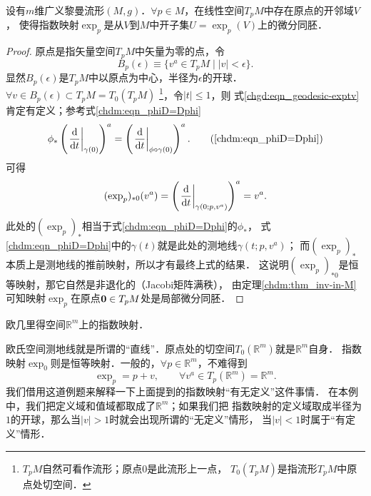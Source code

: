 \begin{theorem}\label{chgd:thm_exp-homeomorphism}
    设有$m$维广义黎曼流形$(M,g)$．$\forall p \in M$，在线性空间$T_p M$中存在原点的开邻域$V$，
    使得指数映射$\exp_{p}$是从$V$到$M$中开子集$U=\exp_{p}(V)$上的微分同胚．
\end{theorem}
\begin{proof}
    原点是指矢量空间$T_p M$中矢量为零的点，令
    \begin{equation}
        B_p(\epsilon) \equiv \{v^a\in T_pM \mid |v|<\epsilon \} .
    \end{equation}
    显然$B_p(\epsilon)$是$T_pM$中以原点为中心，半径为$\epsilon$的开球．
    $\forall v\in B_p(\epsilon) \subset T_pM= T_0(T_pM) $
    {\footnote{$T_pM$自然可看作流形；原点$0$是此流形上一点，
            $T_0(T_p M)$是指流形$T_pM$中原点处切空间．}}，令$|t|\leqslant 1$，则
    式\eqref{chgd:eqn_geodesic-exptv}肯定有定义；参考式\eqref{chdm:eqn_phiD=Dphi}
    \begin{equation}
        \phi_{*}\left(\left.\frac{{\rm d}  }{{\rm d} t}\right|_{\gamma(0)}\right)^a
        = \left(\left.\frac{{\rm d}  }{{\rm d} t}\right|_{\phi\circ\gamma(0)}\right)^a.
        \tag{\ref{chdm:eqn_phiD=Dphi}}
    \end{equation}
    可得
    \begin{equation}
        (\exp_{p})_{*0} (v^a) = \left(\left.\frac{{\rm d}  }{{\rm d} t}
         \right|_{\gamma(0;p,v^a)}\right)^a = v^a .
    \end{equation}
    此处的$(\exp_{p})_{*}$相当于式\eqref{chdm:eqn_phiD=Dphi}的$\phi_{*}$，
    式\eqref{chdm:eqn_phiD=Dphi}中的$\gamma(t)$就是此处的测地线$\gamma(t;p,v^a)$；
    而$(\exp_{p})_{*}$本质上是测地线的推前映射，所以才有最终上式的结果．
    这说明$(\exp_{p})_{*0}$是恒等映射，那它自然是非退化的（Jacobi矩阵满秩），  %
    由定理\ref{chdm:thm_inv-in-M}可知映射$\exp_{p}$在原点${\bf 0}\in T_pM$处是局部微分同胚．
\end{proof}

\begin{example}
    欧几里得空间$\mathbb{R}^m$上的指数映射．
\end{example}
欧氏空间测地线就是所谓的“直线”．原点处的切空间$T_0(\mathbb{R}^m)$就是$\mathbb{R}^m$自身．
指数映射$\exp_{0}$则是恒等映射．一般的，$\forall p\in \mathbb{R}^m$，不难得到
\begin{equation}
    \exp_{p} = p + v, \qquad \forall v^a\in T_p(\mathbb{R}^m)=\mathbb{R}^m.
\end{equation}
我们借用这道例题来解释一下上面提到的指数映射“有无定义”这件事情．
在本例中，我们把定义域和值域都取成了$\mathbb{R}^m$；如果我们把
指数映射的定义域取成半径为$1$的开球，那么当$|v|>1$时就会出现所谓的“无定义”情形，
当$|v|<1$时属于“有定义”情形．


